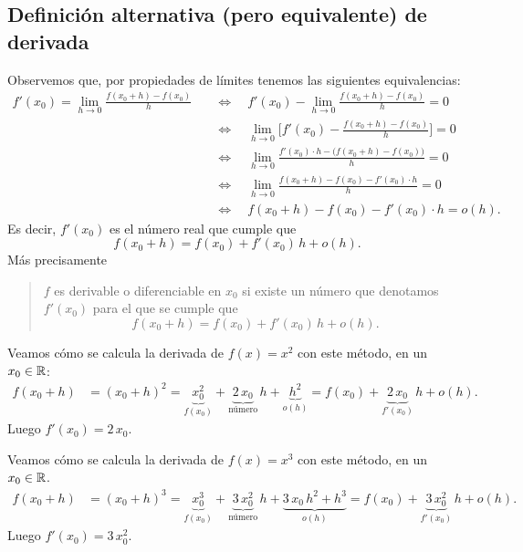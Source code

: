 \subsection*{Definición alternativa (pero equivalente) de derivada}

Observemos que, por propiedades de límites tenemos las siguientes equivalencias:
\begin{align*}
f'(x_0) = \lim_{h\to 0} \frac{f(x_0+h)-f(x_0)}{h}
&\quad\iff\quad
f'(x_0) - \lim_{h\to 0} \frac{f(x_0+h)-f(x_0)}{h} = 0
\\
&\quad\iff\quad
\lim_{h\to 0} \bigg[f'(x_0) - \frac{f(x_0+h)-f(x_0)}{h} \bigg]= 0
\\
&\quad\iff\quad
\lim_{h\to 0} \frac{f'(x_0)\cdot h - \big(f(x_0+h)-f(x_0)\big)}{h}= 0
\\
&\quad\iff\quad
\lim_{h\to 0} \frac{f(x_0+h) - f(x_0) - f'(x_0)\cdot h}{h}= 0
\\
&\quad\iff\quad
f(x_0+h) - f(x_0) - f'(x_0)\cdot h= o(h).
\end{align*}
Es decir, $f'(x_0)$ es el número real que cumple que
\[
f(x_0+h) = f(x_0) + f'(x_0) \, h + o(h).
\]
Más precisamente
\begin{quote}
    $f$ es derivable o diferenciable en $x_0$ si existe un número que denotamos $f'(x_0)$ para el que se cumple que 
    \begin{equation}\label{eq:derivada-o(h)}
    f(x_0+h) = f(x_0) + f'(x_0) \, h + o(h).
    \end{equation}
\end{quote}

\begin{example}
    Veamos cómo se calcula la derivada de $f(x)=x^2$ con este método, en un $x_0\in\mathbb{R}$:
    \begin{align*}
        f(x_0+h) &= (x_0+h)^2 
        = \underbrace{x_0^2}_{f(x_0)} + \underbrace{2 \, x_0 }_{\text{número}} \, h + \underbrace{h^2}_{o(h)}
        = f(x_0) + \underbrace{2 \, x_0}_{f'(x_0)} \, h + o(h).
    \end{align*}
    Luego $f'(x_0)=2\, x_0$.
\end{example}

\begin{example}
    Veamos cómo se calcula la derivada de $f(x)=x^3$ con este método, en un $x_0\in\mathbb{R}$.
    \begin{align*}
        f(x_0+h) &= (x_0+h)^3 
        = \underbrace{x_0^3}_{f(x_0)} + \underbrace{3 \, x_0^2 }_{\text{número}} \, h + \underbrace{3 \, x_0 \, h^2+ h^3}_{o(h)}
        = f(x_0) + \underbrace{3 \, x_0^2}_{f'(x_0)} \, h + o(h).
    \end{align*}
    Luego $f'(x_0)=3\, x_0^2$.
\end{example}

